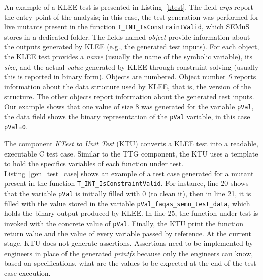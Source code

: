 An example of a KLEE test is presented in Listing~\ref{ktest}. The field \emph{args} report the entry point of the analysis; in this case, the test generation was performed for live mutants present in the function \texttt{T\_INT\_IsConstraintValid}, which SEMuS stores in a dedicated folder. The fields named \emph{object} provide information about the outputs generated by KLEE (e.g., the generated test inputs). 
For each object, the KLEE test provides a \emph{name} (usually the name of the symbolic variable), its \emph{size}, and the actual \emph{value} generated by KLEE through constraint solving (usually this is reported in binary form).
Objects are numbered. Object number \emph{0} reports information about the data structure used by KLEE, that is, the version of the structure. The other objects report information about the generated test inputs.
Our example shows that one value of size 8 was generated for the variable \texttt{pVal}, the data field shows the binary representation of the \texttt{pVal} variable, in this case \texttt{pVal=0}.






The component \emph{KTest to Unit Test} (KTU) converts a KLEE test into a readable, executable C test case. Similar to the TTG component, the KTU uses a template to hold the specifics variables of each function under test. 
Listing~\ref{gen_test_case} shows an example of a test case generated for a mutant present in the function \texttt{T\_INT\_IsConstraintValid}. For instance, line 20 shows that the variable \texttt{pVal} is initially filled with 0 (to clean it), then in line 21, it is filled with the value stored in the variable \texttt{pVal\_faqas\_semu\_test\_data}, which holds the binary output produced by KLEE. In line 25, the function under test is invoked with the concrete value of \texttt{pVal}. Finally, the KTU print the function return value and the value of every variable passed by reference.
At the current stage, KTU does not generate assertions. Assertions need to be implemented by engineers in place of the generated \emph{printfs} because only the engineers can know, based on specifications, what are the values to be expected at the end of the test case execution.


\ENDCHANGEDWPT
